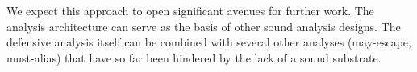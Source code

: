 We expect this approach to open significant avenues for further
work. The analysis architecture can serve as the basis of other sound
analysis designs. The defensive analysis itself can be combined with
several other analyses (may-escape, must-alias) that have so far been
hindered by the lack of a sound substrate.





